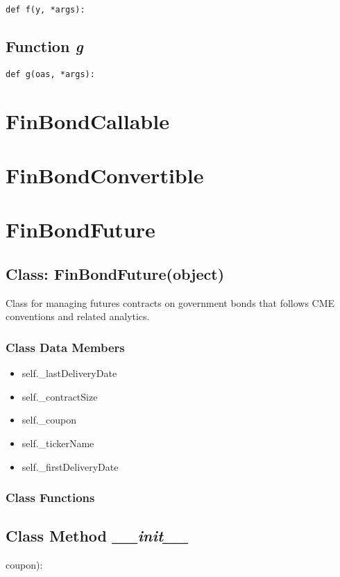 \documentclass[twoside,11pt]{book}
\begin{document}
\begin{lstlisting}
def f(y, *args):
\end{lstlisting}

\subsection{Function {\it g}}


\begin{lstlisting}
def g(oas, *args):
\end{lstlisting}

\newpage
\section{FinBondCallable}

\newpage
\section{FinBondConvertible}

\newpage
\section{FinBondFuture}

\subsection{Class: FinBondFuture(object)}
Class for managing futures contracts on government bonds that follows CME conventions and related analytics. 

\subsubsection{Class Data Members}
\begin{itemize}
\item{self.\_lastDeliveryDate}
\item{self.\_contractSize}
\item{self.\_coupon}
\item{self.\_tickerName}
\item{self.\_firstDeliveryDate}
\end{itemize}

\subsubsection{Class Functions}

\subsection{Class Method {\it \_\_init\_\_}}
coupon):
\end{document}
